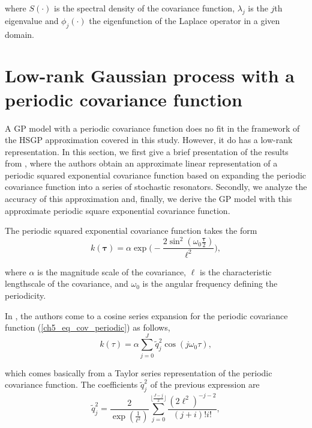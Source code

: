 \documentclass[onecolumn,a4paper,11pt]{article}
\begin{document}
\noindent where $S(\cdot)$ is the spectral density of the covariance function, $\lambda_j$ is the $j$th eigenvalue and $\phi_j(\cdot)$ the eigenfunction of the Laplace operator in a given domain.



\section{Low-rank Gaussian process with a periodic covariance function}\label{ch5_sec_periodic}

A GP model with a periodic covariance function does no fit in the framework of the HSGP approximation covered in this study. However, it do has a low-rank representation. In this section, we first give a brief presentation of the results from \cite{solin2014explicit}, where the authors obtain an approximate linear representation of a periodic squared exponential covariance function based on expanding the periodic covariance function into a series of stochastic resonators. Secondly, we analyze the accuracy of this approximation and, finally, we derive the GP model with this approximate periodic square exponential covariance function.

The periodic squared exponential covariance function takes the form
%
\begin{equation} \label{ch5_eq_cov_periodic}
k(\bm{\tau})= \alpha \exp\!\!\Big(\! -\frac{2\sin^{\!2}\!(\omega_0\frac{\bm{\tau}}{2})}{\ell^2}\Big),
\end{equation}

\noindent where $\alpha$ is the magnitude scale of the covariance, $\ell$ is the characteristic lengthscale of the covariance, and $\omega_0$ is the angular frequency defining the periodicity. 

In \cite{solin2014explicit}, the authors come to a cosine series expansion for the periodic covariance function (\ref{ch5_eq_cov_periodic}) as follows,
% 
\begin{equation} \label{ch5_eq_cov_periodic_taylor_approx}
k(\tau)= \alpha \sum_{j=0}^{J} \tilde{q}_j^2 \cos(j\omega_0 \tau),
\end{equation}

\noindent which comes basically from a Taylor series representation of the periodic covariance function. The coefficients $\tilde{q}_j^2$ of the previous expression are
%
\begin{equation} \label{ch5_eq_q}
\tilde{q}_j^2= \frac{2}{\exp(\frac{1}{\ell^2})} \sum_{j=0}^{\lfloor \frac{J-j}{2} \rfloor} \frac{(2\ell^2)^{-j-2}}{(j+i)!i!},
\end{equation}
\end{document}

